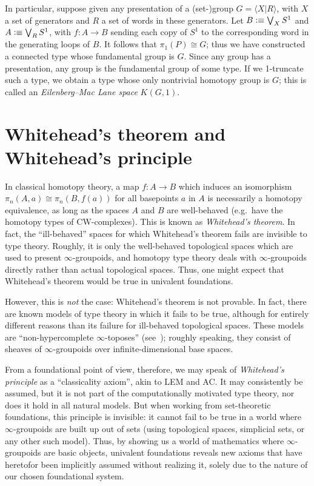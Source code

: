 \begin{eg}\label{eg:kg1}
  In particular, suppose given any presentation of a (set-)group $G = \langle X | R \rangle$, with $X$ a set of generators and $R$ a set of words in these generators.
  Let $B\vcentcolon\equiv \bigvee_X S^1$ and $A\vcentcolon\equiv \bigvee_R S^1$, with $f:A\to B$ sending each copy of $S^1$ to the corresponding word in the generating loops of $B$.
  It follows that $\pi_1(P) \cong G$; thus we have constructed a connected type whose fundamental group is $G$.
  Since any group has a presentation, any group is the fundamental group of some type.
  If we 1-truncate such a type, we obtain a type whose only nontrivial homotopy group is $G$; this is called an \emph{Eilenberg--Mac Lane space} $K(G,1)$.
\end{eg}


\section{Whitehead's theorem and Whitehead's principle}
\label{sec:whitehead}

In classical homotopy theory, a map $f:A\to B$ which induces an isomorphism $\pi_n(A,a) \cong \pi_n(B,f(a))$ for all basepoints $a$ in $A$ is necessarily a homotopy equivalence, as long as the spaces $A$ and $B$ are well-behaved (e.g.\ have the homotopy types of CW-complexes).
This is known as \emph{Whitehead's theorem}.
In fact, the ``ill-behaved'' spaces for which Whitehead's theorem fails are invisible to type theory.
Roughly, it is only the well-behaved topological spaces which are used to present $\infty$-groupoids, and homotopy type theory deals with $\infty$-groupoids directly rather than actual topological spaces.
Thus, one might expect that Whitehead's theorem would be true in univalent foundations.

However, this is \emph{not} the case: Whitehead's theorem is not provable.
In fact, there are known models of type theory in which it fails to be true, although for entirely different reasons than its failure for ill-behaved topological spaces.
These models are ``non-hypercomplete $\infty$-toposes'' (see~\cite{lurie:higher-topoi}); roughly speaking, they consist of sheaves of $\infty$-groupoids over infinite-dimensional base spaces.

From a foundational point of view, therefore, we may speak of \emph{Whitehead's principle} as a ``classicality axiom'', akin to LEM and AC.
It may consistently be assumed, but it is not part of the computationally motivated type theory, nor does it hold in all natural models.
But when working from set-theoretic foundations, this principle is invisible: it cannot fail to be true in a world where $\infty$-groupoids are built up out of sets (using topological spaces, simplicial sets, or any other such model).
Thus, by showing us a world of mathematics where $\infty$-groupoids are basic objects, univalent foundations reveals new axioms that have heretofor been implicitly assumed without realizing it, solely due to the nature of our chosen foundational system.


